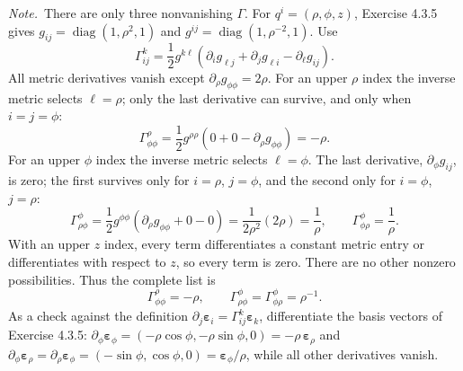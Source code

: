 \emph{Note.}~There are only three nonvanishing $\Gamma$.
\solution
For $q^i=(\rho,\phi,z)$, Exercise 4.3.5 gives
$g_{ij}=\operatorname{diag}(1,\rho^2,1)$ and
$g^{ij}=\operatorname{diag}(1,\rho^{-2},1)$. Use
\[
\Gamma^k_{ij}=\frac12g^{k\ell}
 (\partial_i g_{\ell j}+\partial_jg_{\ell i}-\partial_\ell g_{ij}).
\]
All metric derivatives vanish except $\partial_\rho g_{\phi\phi}=2\rho$.
For an upper $\rho$ index the inverse metric selects $\ell=\rho$;
only the last derivative can survive, and only when $i=j=\phi$:
\[
\Gamma^\rho_{\phi\phi}
=\frac12g^{\rho\rho}(0+0-\partial_\rho g_{\phi\phi})
=-\rho.
\]
For an upper $\phi$ index the inverse metric selects $\ell=\phi$. The
last derivative, $\partial_\phi g_{ij}$, is zero; the first survives
only for $i=\rho$, $j=\phi$, and the second only for $i=\phi$,
$j=\rho$:
\[
\Gamma^\phi_{\rho\phi}
=\frac12g^{\phi\phi}(\partial_\rho g_{\phi\phi}+0-0)
=\frac1{2\rho^2}(2\rho)=\frac1\rho,
\qquad
\Gamma^\phi_{\phi\rho}=\frac1\rho.
\]
With an upper $z$ index, every term differentiates a constant metric
entry or differentiates with respect to $z$, so every term is zero.
There are no other nonzero possibilities. Thus the complete list is
\[
\boxed{\Gamma^\rho_{\phi\phi}=-\rho,\qquad
\Gamma^\phi_{\rho\phi}=\Gamma^\phi_{\phi\rho}=\rho^{-1}}.
\]
As a check against the definition
$\partial_j\boldsymbol\varepsilon_i=\Gamma^k_{ij}\boldsymbol\varepsilon_k$,
differentiate the basis vectors of Exercise 4.3.5:
$\partial_\phi\boldsymbol\varepsilon_\phi
=(-\rho\cos\phi,-\rho\sin\phi,0)=-\rho\,\boldsymbol\varepsilon_\rho$ and
$\partial_\phi\boldsymbol\varepsilon_\rho
=\partial_\rho\boldsymbol\varepsilon_\phi
=(-\sin\phi,\cos\phi,0)=\boldsymbol\varepsilon_\phi/\rho$, while all
other derivatives vanish.

